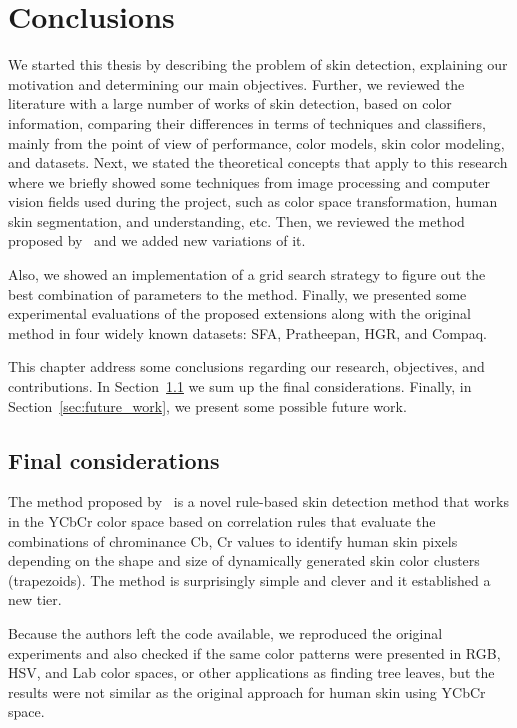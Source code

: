 \chapter{Conclusions}
\label{cap:conclusoes}

We started this thesis by describing the problem of skin detection, explaining our motivation and determining our main objectives. Further, we reviewed the literature with a large number of works of skin detection, based on color information, comparing their differences in terms of techniques and classifiers, mainly from the point of view of performance, color models, skin color modeling, and datasets. Next, we stated the theoretical concepts that apply to this research where we briefly showed some techniques from image processing and computer vision fields used during the project, such as color space transformation, human skin segmentation, and understanding, etc. Then, we reviewed the method proposed by~\citet{brancati:17} and we added new variations of it.

Also, we showed an implementation of a grid search strategy to figure out the best combination of parameters to the method. Finally, we presented some experimental evaluations of the proposed extensions along with the original method in four widely known datasets: SFA, Pratheepan, HGR, and Compaq.

This chapter address some conclusions regarding our research, objectives, and contributions. In Section~\ref{sec:final_considerations} we sum up the final considerations. Finally, in Section~\ref{sec:future_work}, we present some possible future work.


\section{Final considerations}
\label{sec:final_considerations}
The method proposed by~\citet{brancati:17} is a novel rule-based skin detection method that works in the YCbCr color space based on correlation rules that evaluate the combinations of chrominance Cb, Cr values to identify human skin pixels depending on the shape and size of dynamically generated skin color clusters (trapezoids). The method is surprisingly simple and clever and it established a new tier.

Because the authors left the code available, we reproduced the original experiments and also checked if the same color patterns were presented in RGB, HSV, and Lab color spaces, or other applications as finding tree leaves, but the results were not similar as the original approach for human skin using YCbCr space.

